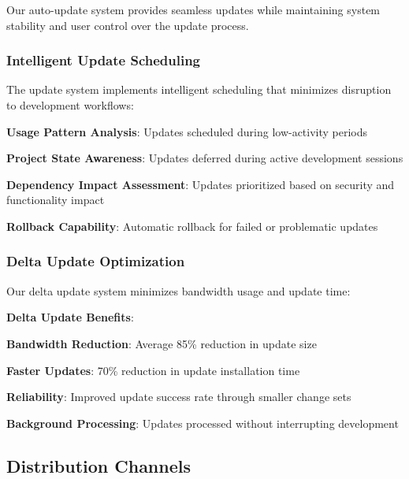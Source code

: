 Our auto-update system provides seamless updates while maintaining system stability and user control over the update process.

\subsubsection*{Intelligent Update Scheduling}

The update system implements intelligent scheduling that minimizes disruption to development workflows:

\begin{compactlist}
    \item \textbf{Usage Pattern Analysis}: Updates scheduled during low-activity periods
    \item \textbf{Project State Awareness}: Updates deferred during active development sessions
    \item \textbf{Dependency Impact Assessment}: Updates prioritized based on security and functionality impact
    \item \textbf{Rollback Capability}: Automatic rollback for failed or problematic updates
\end{compactlist}

\subsubsection*{Delta Update Optimization}

Our delta update system minimizes bandwidth usage and update time:

\begin{successbox}
\textbf{Delta Update Benefits}:
\begin{compactlist}
    \item \textbf{Bandwidth Reduction}: Average 85\% reduction in update size
    \item \textbf{Faster Updates}: 70\% reduction in update installation time
    \item \textbf{Reliability}: Improved update success rate through smaller change sets
    \item \textbf{Background Processing}: Updates processed without interrupting development
\end{compactlist}
\end{successbox}

\subsection*{Distribution Channels}

